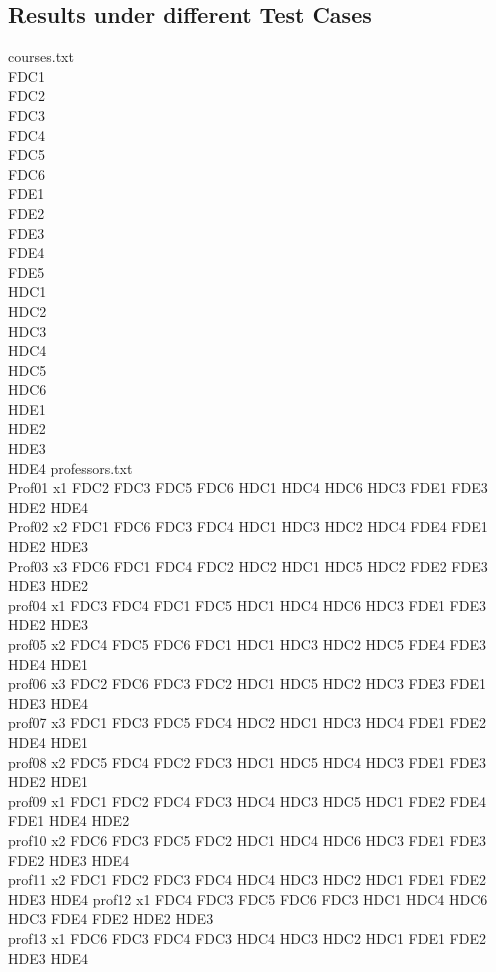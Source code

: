 \documentclass{article}
\begin{document}
\subsection*{Results under different Test Cases}
courses.txt
\\FDC1
\\FDC2
\\FDC3
\\FDC4
\\FDC5
\\FDC6
\\FDE1
\\FDE2
\\FDE3
\\FDE4
\\FDE5
\\HDC1
\\HDC2
\\HDC3
\\HDC4
\\HDC5
\\HDC6
\\HDE1
\\HDE2
\\HDE3
\\HDE4
\break
\break
professors.txt
\\Prof01  x1 FDC2 FDC3 FDC5 FDC6 HDC1 HDC4 HDC6 HDC3 FDE1 FDE3 HDE2 HDE4
\\Prof02  x2 FDC1 FDC6 FDC3 FDC4 HDC1 HDC3 HDC2 HDC4 FDE4 FDE1 HDE2 HDE3 
\\Prof03  x3 FDC6 FDC1 FDC4 FDC2 HDC2 HDC1 HDC5 HDC2 FDE2 FDE3 HDE3 HDE2
\\prof04  x1 FDC3 FDC4 FDC1 FDC5 HDC1 HDC4 HDC6 HDC3 FDE1 FDE3 HDE2 HDE3
\\prof05  x2 FDC4 FDC5 FDC6 FDC1 HDC1 HDC3 HDC2 HDC5 FDE4 FDE3 HDE4 HDE1
\\prof06  x3 FDC2 FDC6 FDC3 FDC2 HDC1 HDC5 HDC2 HDC3 FDE3 FDE1 HDE3 HDE4
\\prof07  x3 FDC1 FDC3 FDC5 FDC4 HDC2 HDC1 HDC3 HDC4 FDE1 FDE2 HDE4 HDE1
\\prof08  x2 FDC5 FDC4 FDC2 FDC3 HDC1 HDC5 HDC4 HDC3 FDE1 FDE3 HDE2 HDE1
\\prof09  x1 FDC1 FDC2 FDC4 FDC3 HDC4 HDC3 HDC5 HDC1 FDE2 FDE4 FDE1 HDE4 HDE2
\\prof10  x2 FDC6 FDC3 FDC5 FDC2 HDC1 HDC4 HDC6 HDC3 FDE1 FDE3 FDE2 HDE3 HDE4
\\prof11  x2 FDC1 FDC2 FDC3 FDC4 HDC4 HDC3 HDC2 HDC1 FDE1 FDE2 HDE3 HDE4 
prof12  x1 FDC4 FDC3 FDC5 FDC6 FDC3 HDC1 HDC4 HDC6 HDC3 FDE4 FDE2 HDE2 HDE3
\\prof13  x1 FDC6 FDC3 FDC4 FDC3 HDC4 HDC3 HDC2 HDC1 FDE1 FDE2 HDE3 HDE4 
\end{document}
